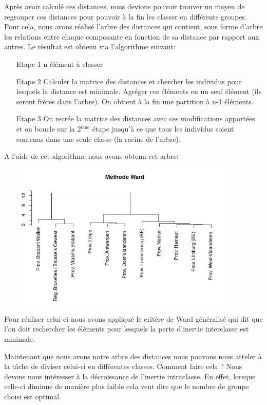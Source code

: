 \documentclass{article}
\begin{document}
Après avoir calculé ces distances, nous devions pouvoir trouver un moyen de regrouper ces distances pour pouvoir à la fin les classer en différents groupes. Pour cela, nous avons réalisé l'arbre des distances qui contient, sous forme d'arbre les relations entre chaque composante en fonction de sa distance par rapport aux autres. Le résultat est obtenu via l'algorithme suivant:

\begin{itemize}
	\item[Etape 1] n élément à classer
	\item[Etape 2] Calculer la matrice des distances et chercher les individus pour lesquels la distance est minimale. 
	Agréger ces éléments en un seul élément (ils seront frères dans l'arbre). On obtient à la fin une partition à n-1 éléments.
	\item[Etape 3] On recrée la matrice des distances avec ces modifications apportées et on boucle sur la 2$^{\text{ème}}$ étape jusqu'à ce que tous les individus soient contenus dans une seule classe (la racine de l'arbre).
\end{itemize}

A l'aide de cet algorithme nous avons obtenu cet arbre:

\includegraphics[width=12cm,height=7cm]{tree}

Pour réaliser celui-ci nous avons appliqué le critère de Ward généralisé qui dit que l'on doit rechercher les éléments pour lesquels la perte d'inertie interclasse est minimale.


Maintenant que nous avons notre arbre des distances nous pouvons nous atteler à la tâche de diviser celui-ci en différentes classes. Comment faire cela ? Nous devons nous intéresser à la décroissance de l'inertie intraclasse. En effet, lorsque celle-ci diminue de manière plus faible cela veut dire que le nombre de groupe choisi est optimal.
\end{document}
